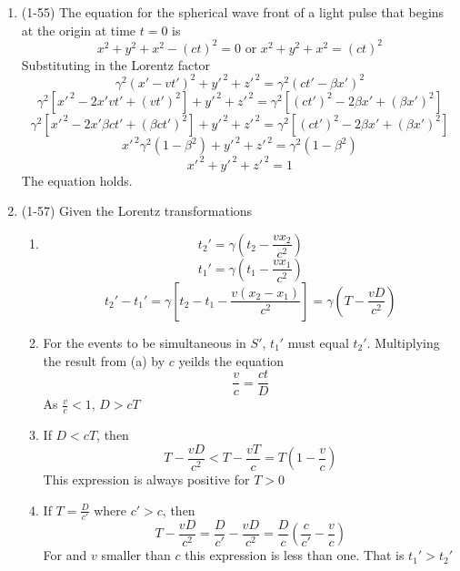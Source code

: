 \documentclass{physicsHW}
\begin{document}
\begin{enumerate}
\begin{enumerate}
			
		\end{enumerate}

		\item (1-55) The equation for the spherical wave front of a light pulse that begins at the origin at time $t=0$ is 
		\[
			x^2 + y^2 + x^2 - (ct)^2 = 0 \text{ or } x^2 + y^2 + x^2 = (ct)^2
		\]
		Substituting in the Lorentz factor
		\[
			\gamma^2(x'-vt')^2 + y'^{\,2} + z'^{\,2} = \gamma^2 (ct' -  \beta x')^2 
		\]
		\[
			\gamma^2 [x'^{\,2}-2x'vt'+(vt')^2] + y'^{\,2} + z'^{\,2} = \gamma^2 [(ct')^2 - 2\beta x'+ (\beta x')^2]
		\]
		\[
			\gamma^2 [ x'^{\,2} - 2 x' \beta ct' + (\beta ct')^2] +  y'^{\,2} + z'^{\,2} = \gamma^2 [(ct')^2 - 2\beta x'+ (\beta x')^2]
		\]
		\[
			x'^{\,2} \gamma^2 (1 - \beta^2)  + y'^{\,2} + z'^{\,2} = \gamma^2(1-\beta^2)
		\]
		\[
			x'^{\,2} + y'^{\,2} + z'^{\,2} = 1
		\]
		The equation holds.

		\item (1-57) Given the Lorentz transformations
		\begin{enumerate}
			\item
			\[
				t_2' = \gamma \left( t_2 - \frac{vx_2}{c^2} \right)
			\]
			\[
				t_1' = \gamma \left( t_1 - \frac{vx_1}{c^2} \right)
			\]
			\[
				t_2' - t_1' = \gamma \left[ t_2 - t_1 - \frac{v(x_2-x_1)}{c^2} \right] = \gamma \left( T - \frac{vD}{c^2} \right)
			\]

			\item For the events to be simultaneous in $S'$, $t_1'$ must equal $t_2'$. Multiplying the result from (a) by $c$ yeilds the equation
			\[
				\frac{v}{c}  = \frac{ct}{D} 
			\]
			As $\frac{v}{c} < 1$, $D > cT$
			\item If $D < cT$, then
			\[
				T - \frac{vD}{c^2} < T - \frac{vT}{c} = T \left (1 - \frac{v}{c} \right)
			\]
		    This expression is always positive for $T > 0$
			\item If $T = \frac{D}{c'} $ where $c' > c$, then 
			\[
				T - \frac{vD}{c^2}  = \frac{D}{c'} - \frac{vD}{c^2} = \frac{D}{c} \left( \frac{c}{c'} - \frac{v}{c} \right)
			\]
			For and $v$ smaller than $c$ this expression is less than one. That is $t_1' > t_2'$


		\end{enumerate}


\end{enumerate}
\end{document}

